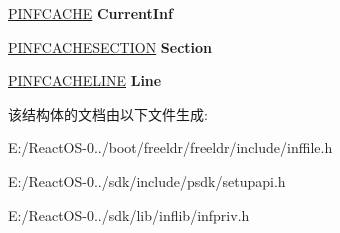 \begin{DoxyCompactItemize}
\hyperlink{struct___i_n_f_c_a_c_h_e}{P\+I\+N\+F\+C\+A\+C\+HE} {\bfseries Current\+Inf}
\item 
\mbox{\label{struct___i_n_f_c_o_n_t_e_x_t_a8e09dc06902b9776be0a90a19a6c8369}} 
\hyperlink{struct___i_n_f_c_a_c_h_e_s_e_c_t_i_o_n}{P\+I\+N\+F\+C\+A\+C\+H\+E\+S\+E\+C\+T\+I\+ON} {\bfseries Section}
\item 
\mbox{\label{struct___i_n_f_c_o_n_t_e_x_t_a7eb51e6eff3adc2c53a9b0807068f6bc}} 
\hyperlink{struct___i_n_f_c_a_c_h_e_l_i_n_e}{P\+I\+N\+F\+C\+A\+C\+H\+E\+L\+I\+NE} {\bfseries Line}
\end{DoxyCompactItemize}


该结构体的文档由以下文件生成\+:\begin{DoxyCompactItemize}
\item 
E\+:/\+React\+O\+S-\/0../boot/freeldr/freeldr/include/inffile.\+h\item 
E\+:/\+React\+O\+S-\/0../sdk/include/psdk/setupapi.\+h\item 
E\+:/\+React\+O\+S-\/0../sdk/lib/inflib/infpriv.\+h\end{DoxyCompactItemize}
